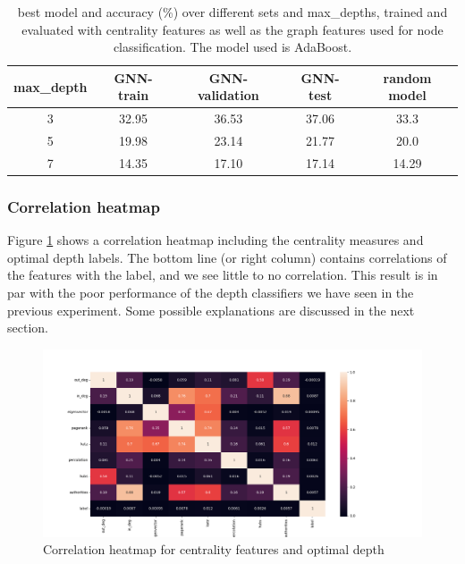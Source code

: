 \documentclass[11pt,a4paper]{article}
\begin{document}
	\begin{table}[t]
		\centering
		\begin{tabular}{c|cccc}
			\hline
			\textbf{max\_depth} & \textbf{GNN-train} & \textbf{GNN-validation} & \textbf{GNN-test} & \textbf{random model} \\
			\hline
			3 & 32.95 & 36.53 & 37.06 & 33.3 \\
			5 & 19.98 & 23.14 & 21.77 & 20.0 \\
			7 & 14.35 & 17.10 & 17.14 & 14.29 \\\hline
		\end{tabular}
		\caption{best model and accuracy (\%) over different sets and max\_depths, trained and evaluated with centrality features as well as the graph features used for node classification. The model used is AdaBoost.}\label{tab:clf_performance_combined}
	\end{table}

	\subsubsection*{Correlation heatmap}
	Figure \ref{fig:correlation_heatmap} shows a correlation heatmap including the centrality measures and optimal depth labels. The bottom line (or right column) contains correlations of the features with the label, and we see little to no correlation. This result is in par with the poor performance of the depth classifiers we have seen in the previous experiment. Some possible explanations are discussed in the next section.
	\begin{figure}[h]
		\centering
		\includegraphics[width=1\linewidth]{images/correlation_heatmap_depth5_testset.png}
		\caption{Correlation heatmap for centrality features and optimal depth}
		\label{fig:correlation_heatmap}
	\end{figure}
\end{document}
